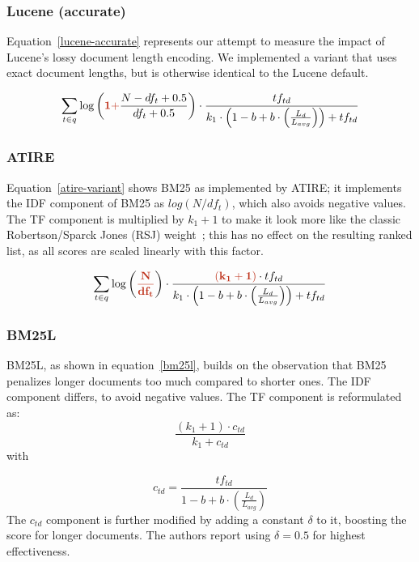 \subsubsection{Lucene (accurate)}

Equation~\ref{lucene-accurate} represents our attempt to measure the impact of Lucene’s lossy document length encoding. We implemented a variant that uses exact document lengths, but is otherwise identical to the Lucene default.

\begin{equation}
	\label{lucene-accurate}
	\sum_{t\in q}\log\left(\mathbf{\begingroup\color{ruhuisstijlrood}1 +\endgroup} \frac{N-df_t+0.5}{df_t+0.5}\right)\cdot\frac{tf_{td}}{k_1\cdot \left(1-b+b\cdot\left(\frac{L_d}{L_{avg}}\right)\right)+tf_{td}}
\end{equation}

\subsubsection{ATIRE~\cite{ATIRE}}
Equation~\ref{atire-variant} shows BM25 as implemented by ATIRE; it implements the IDF component of BM25 as $log(N/df_{t})$, which also avoids negative values. The TF component is multiplied by $k_1+1$ to make it look more like the classic Robertson/Sparck Jones (RSJ) weight~\cite{RSJ}; this has no effect on the resulting ranked list, as all scores are scaled linearly with this factor.

\begin{equation}
	\label{atire-variant}
	\sum_{t\in q}\log\left(\mathbf{\begingroup\color{ruhuisstijlrood}\frac{N}{df_t}\endgroup}\right)\cdot\frac{\mathbf{\begingroup\color{ruhuisstijlrood}\left(k_1 + 1\right)\endgroup}\cdot tf_{td}}{k_1\cdot\left(1-b+b\cdot\left(\frac{L_{d}}{L_{avg}}\right)\right)+tf_{td}}
\end{equation}

\subsubsection{BM25L~\cite{bm25l}}
BM25L, as shown in equation~\ref{bm25l}, builds on the observation that BM25 penalizes longer documents too much compared to shorter ones. The IDF component differs, to avoid negative values. The TF component is reformulated as:
\begin{equation}
	\frac{\left(k_1+1\right)\cdot c_{td}}{k_1+c_{td}}  
\end{equation}
with 

\begin{equation}
	c_{td} = \frac{tf_{td}}{1 - b + b \cdot \left(\frac{L_d}{L_{avg}}\right)}  
\end{equation}
The $c_{td}$ component is further modified by adding a constant $\delta$ to it, boosting the score for longer documents. The authors report using $\delta = 0.5$ for highest effectiveness.

